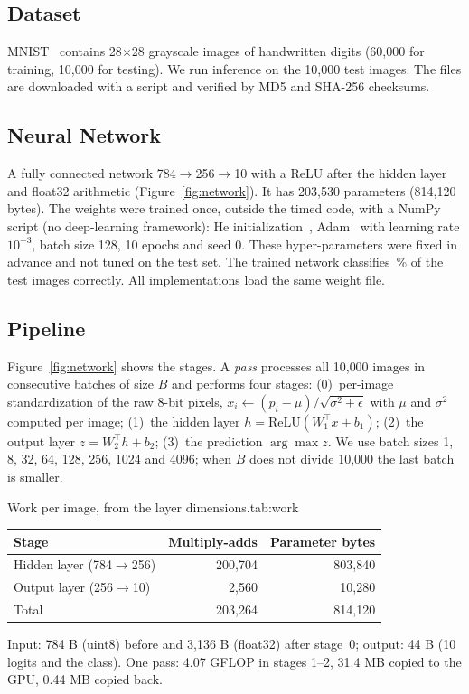 \subsection{Dataset}
MNIST~\cite{lecun1998gradient} contains 28$\times$28 grayscale images of handwritten digits (60{,}000 for training, 10{,}000 for testing). We run inference on the 10{,}000 test images. The files are downloaded with a script and verified by MD5 and SHA-256 checksums.

\subsection{Neural Network}
A fully connected network 784$\to$256$\to$10 with a ReLU after the hidden layer and float32 arithmetic (Figure~\ref{fig:network}). It has 203{,}530 parameters (814{,}120 bytes). The weights were trained once, outside the timed code, with a NumPy script (no deep-learning framework): He initialization~\cite{he2015delving}, Adam~\cite{kingma2015adam} with learning rate $10^{-3}$, batch size 128, 10 epochs and seed 0. These hyper-parameters were fixed in advance and not tuned on the test set. The trained network classifies \,\% of the test images correctly. All implementations load the same weight file.

\subsection{Pipeline}
Figure~\ref{fig:network} shows the stages. A \emph{pass} processes all 10{,}000 images in consecutive batches of size $B$ and performs four stages: (0)~per-image standardization of the raw 8-bit pixels, $x_i\leftarrow(p_i-\mu)/\sqrt{\sigma^2+\epsilon}$ with $\mu$ and $\sigma^2$ computed per image; (1)~the hidden layer $h=\mathrm{ReLU}(W_1^{\top}x+b_1)$; (2)~the output layer $z=W_2^{\top}h+b_2$; (3)~the prediction $\arg\max z$. We use batch sizes 1, 8, 32, 64, 128, 256, 1024 and 4096; when $B$ does not divide 10{,}000 the last batch is smaller.

\begin{coltable}{Work per image, from the layer dimensions.}{tab:work}
\begin{tabular}{@{}lrr@{}}
\toprule
Stage & Multiply-adds & Parameter bytes \\
\midrule
Hidden layer (784$\to$256) & 200{,}704 & 803{,}840 \\
Output layer (256$\to$10) & 2{,}560 & 10{,}280 \\
\midrule
Total & 203{,}264 & 814{,}120 \\
\bottomrule
\end{tabular}

\smallskip
\footnotesize Input: 784 B (uint8) before and 3{,}136 B (float32) after stage~0; output: 44 B (10 logits and the class). One pass: 4.07 GFLOP in stages 1--2, 31.4 MB copied to the GPU, 0.44 MB copied back.
\end{coltable}


